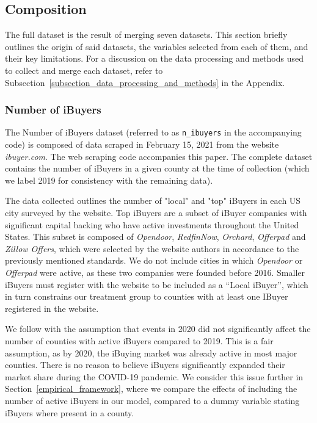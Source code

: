\subsection{Composition}\label{subsection_composition}
The full dataset is the result of merging seven datasets. This section briefly outlines the origin of said datasets, the variables selected from each of them, and their key limitations. For a discussion on the data processing and methods used to collect and merge each dataset, refer to Subsection~\ref{subsection_data_processing_and_methods} in the Appendix.

\subsubsection{Number of iBuyers}\label{subsubsec_n_ibuyers}
The Number of iBuyers dataset (referred to as \lstinline{n_ibuyers} in the accompanying code) is composed of data scraped in February 15, 2021 from the website \textit{ibuyer.com}\cite{iBuyer}. The web scraping code accompanies this paper. The complete dataset contains the number of iBuyers in a given county at the time of collection (which we label 2019 for consistency with the remaining data). 

The data collected outlines the number of "local" and "top" iBuyers in each US city surveyed by the website. Top iBuyers are a subset of iBuyer companies with significant capital backing who have active investments throughout the United States. This subset is composed of \textit{Opendoor}, \textit{RedfinNow}, \textit{Orchard}, \textit{Offerpad} and \textit{Zillow Offers}, which were selected by the website authors in accordance to the previously mentioned standards. We do not include cities in which \textit{Opendoor} or \textit{Offerpad} were active, as these two companies were founded before 2016. Smaller iBuyers must register with the website to be included as a ``Local iBuyer'', which in turn constrains our treatment group to counties with at least one IBuyer registered in the website. 

We follow with the assumption that events in 2020 did not significantly affect the number of counties with active iBuyers compared to 2019. This is a fair assumption, as by 2020, the iBuying market was already active in most major counties. There is no reason to believe iBuyers significantly expanded their market share during the COVID-19 pandemic. We consider this issue further in Section~\ref{empirical_framework}, where we compare the effects of including the number of active iBuyers in our model, compared to a dummy variable stating iBuyers where present in a county.

